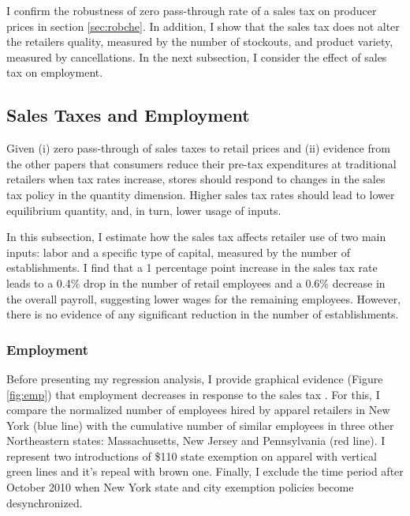 \documentclass[12pt]{article}
\begin{document}
	I confirm the robustness of zero pass-through rate of a sales tax on producer prices in section \ref{sec:robche}. In addition, I show that the sales tax does not alter the retailers quality, measured by the number of stockouts, and product variety, measured by cancellations. In the next subsection, I consider the effect of sales tax on employment.
	
	
	\subsection{Sales Taxes and Employment}
	
	Given (i) zero pass-through of sales taxes to retail prices and (ii) evidence from the other papers \citep{einav, hu} that consumers reduce their pre-tax expenditures at traditional retailers when tax rates increase, stores should respond to changes in the sales tax policy in the quantity dimension. Higher sales tax rates should lead to lower equilibrium quantity, and, in turn, lower usage of inputs. 
	
	In this subsection, I estimate how the sales tax affects retailer use of two main inputs: labor and a specific type of capital, measured by the number of establishments. I find that a 1 percentage point increase in the sales tax rate leads to a 0.4\% drop in the number of retail employees and a 0.6\% decrease in the overall payroll, suggesting lower wages for the remaining employees. However, there is no evidence of any significant reduction in the number of establishments. 
	
	\subsubsection{Employment}
	
	
	
	
	Before presenting my regression analysis, I provide graphical evidence (Figure \ref{fig:emp}) that employment decreases in response to the sales tax . For this, I compare the normalized number of employees hired by apparel retailers in New York (blue line) with the cumulative number  of similar employees in three other Northeastern states: Massachusetts, New Jersey and Pennsylvania (red line). I represent two introductions of \$110 state exemption on apparel with vertical green lines and it's repeal with brown one. Finally, I exclude the time period after October 2010 when New York state and city exemption policies become desynchronized.
	
\end{document}
